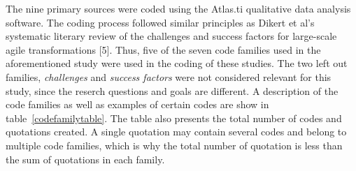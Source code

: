 The nine primary sources were coded using the Atlas.ti qualitative
data analysis software. The coding process followed similar principles
as Dikert et al's systematic literary review of the challenges and
success factors for large-scale agile transformations [5]. Thus,
five of the seven code families used in the aforementioned study
were used in the coding of these studies. The two left out families,
\textit{challenges} and \textit{success factors} were not considered
relevant for this study, since the reserch questions and goals are
different. A description of the code families as well as examples
of certain codes are show in table~\ref{codefamilytable}. The table
also presents the total number of codes and quotations created. A
single quotation may contain several codes and belong to multiple code
families, which is why the total number of quotation is less than the
sum of quotations in each family.

\bigskip
{
}
